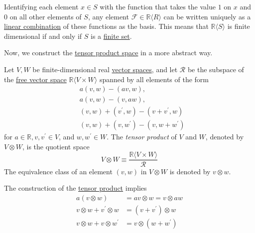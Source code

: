 \documentclass{article}
\newcounter{theorem}[section]
\newcounter{definition}[section]
\begin{document}
    Identifying each element $x \in S$ with the function that takes the value $1$ on $x$ and $0$ on all other elements of $S$, any element $\mathcal{F} \in \mathbb{R} \langle R \rangle$ can be written uniquely as a \hyperref[lin-def:linear-combination]{linear combination} of these functions as the basis. This means that $\mathbb{R} \langle S \rangle$ is finite dimensional if and only if $S$ is a \hyperref[st-def:finite-set]{finite set}. 

    Now, we construct the \hyperref[lin-def:tensor]{tensor product space} in a more abstract way. 
    \begin{definition}
      \label{def:tensor-product}
    Let $V, W$ be finite-dimensional real \hyperref[lin-def:vector-space]{vector spaces}, and let $\mathcal{R}$ be the subspace of the \hyperref[lin-def:free-vector-space]{free vector space} $\mathbb{R} \langle V \times W \rangle$ spanned by all elements of the form 
    \begin{align*}
        &a (v, w) - (a v, w), \\
        &a (v, w) - (v, a w), \\
        &(v, w) + (v^\prime, w) - (v + v^\prime, w) \\
        &(v, w) + (v, w^\prime) - (v, w + w^\prime) 
    \end{align*}
    for $a \in \mathbb{R}, v, v^\prime \in V$, and $w, w^\prime \in W$. The \textit{tensor product} of $V$ and $W$, denoted by $V \otimes W$, is the quotient space 
    \begin{equation}
      V \otimes W \equiv \frac{\mathbb{R} \langle V \times W \rangle}{\mathcal{R}}
    \end{equation}
    The equivalence class of an element $(v, w)$ in $V \otimes W$ is denoted by $v \otimes w$. 
    \end{definition}

    \begin{theorem}
      \label{thm:bilinearity-of-the-tensor-product}
    The construction of the \hyperref[def:tensor-product]{tensor product} implies 
    \begin{align*}
        a (v \otimes w) & = av \otimes w = v \otimes a w \\
        v \otimes w + v^\prime \otimes w & = (v + v^\prime) \otimes w \\
        v \otimes w + v \otimes w^\prime & = v \otimes (w + w^\prime) 
    \end{align*}
    \end{theorem}
\end{document}
